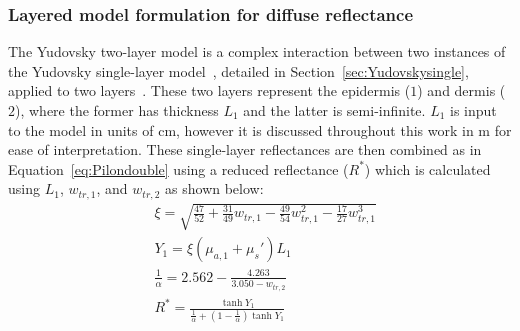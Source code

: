 \subsubsection{Layered model formulation for diffuse reflectance}\label{sec:Yudovsky2009}
% 
The Yudovsky two-layer model is a complex interaction between two instances of the Yudovsky single-layer model~\citep{Yudovsky2009}, detailed in Section~\ref{sec:Yudovskysingle}, applied to two layers~\citep{Yudovsky2009}. 
These two layers represent the epidermis ($1$) and dermis ($2$), where the former has thickness $L_1$ and the latter is semi-infinite. $L_1$ is input to the model in units of cm, however it is discussed throughout this work in \textmu m for ease of interpretation.
These single-layer reflectances are then combined as in Equation~\eqref{eq:Pilondouble} using a reduced reflectance ($R^*$) which is calculated using $L_1$, $w_{tr, 1}$, and $w_{tr,2}$ as 
shown below:
\begin{equation}
\begin{aligned}
    & \xi = \sqrt{\frac{47}{52} + \frac{31}{49}w_{tr, 1} - \frac{49}{54}w_{tr, 1}^2 - \frac{17}{27}w_{tr, 1}^3} \\
    & Y_1 = \xi(\mu_{a,1} + \mu_s')L_1 \\
    & \frac{1}{\alpha} = 2.562 - \frac{4.263}{3.050 - w_{tr, 2}} \\
    & R^* = \frac{\tanh{Y_1}}{\frac{1}{\alpha} + (1 - \frac{1}{\alpha})\tanh{Y_1}} \\
\end{aligned}
\label{eq:reducedR}
\end{equation} 
